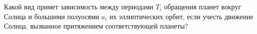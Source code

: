 Какой вид примет зависимость между периодами $T_i$ обращения планет
вокруг Солнца и большими полуосями $a_i$ их эллиптических орбит, если
учесть движение Солнца, вызванное притяжением соответствующей планеты?
